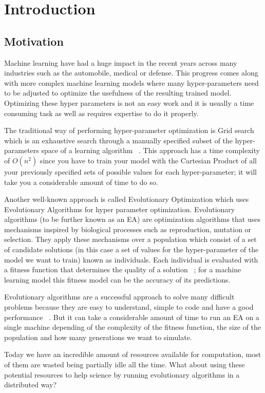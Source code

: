 \chapter{Introduction}
\section{Motivation}
Machine learning have had a huge impact in the recent years across many industries such as the automobile, medical or defense. This progress comes along with more complex machine learning models where many hyper-parameters need to be adjusted to optimize the usefulness of the resulting trained model. Optimizing these hyper parameters is not an easy work and it is usually a time consuming task as well as requires expertise to do it properly.

The traditional way of performing hyper-parameter optimization is Grid search which is an exhaustive search through a manually specified subset of the hyper-parameters space of a learning algorithm ~\cite{wikipedia-Hyperparameter_optimization}. This approach has a time complexity of $O(n^{2})$ since you have to train your model with the Cartesian Product of all your previously specified sets of possible values for each hyper-parameter; it will take you a considerable amount of time to do so.

Another well-known approach is called Evolutionary Optimization which uses Evolutionary Algorithms for hyper parameter optimization. Evolutionary algorithms (to be further known as an EA) are optimization algorithms that uses mechanisms inspired by biological processes such as reproduction, mutation or selection. They apply these mechanisms over a population which consist of a set of candidate solutions (in this case a set of values for the hyper-parameter of the model we want to train) known as individuals. Each individual is evaluated with a fitness function that determines the quality of a solution ~\cite{wikipedia-Evolutionary_Algorithm}; for a machine learning model this fitness model can be the accuracy of its predictions.

Evolutionary algorithms are a successful approach to solve many difficult problems because they are easy to understand, simple to code and have a good performance ~\cite{Intro-to-EA}. But it can take a considerable amount of time to run an EA on a single machine depending of the complexity of the fitness function, the size of the population and how many generations we want to simulate.

Today we have an incredible amount of resources available for computation, most of them are wasted being partially idle all the time. What about using these potential resources to help science by running evolutionary algorithms in a distributed way?

